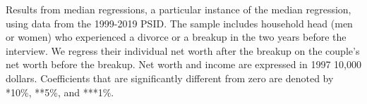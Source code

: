 \begin{table}[H]\centering                                  \scriptsize                                 \caption{Changes in net worth upon divorce and breakup}                                   \label{tab:assdiv}                                 
\begin{minipage}{\textwidth}
\scriptsize\smallskip
Results from median regressions, a particular instance of the median regression, using data from the 1999-2019 PSID. The sample includes household head (men or women) who experienced a divorce or a breakup in the two years before the interview. We regress their individual net worth after the breakup on the couple's net worth before the breakup. Net worth and income are expressed in 1997 10,000 dollars. Coefficients that are significantly different from zero are denoted by *10\%, **5\%, and ***1\%.
\\
\end{minipage}
\end{table}
